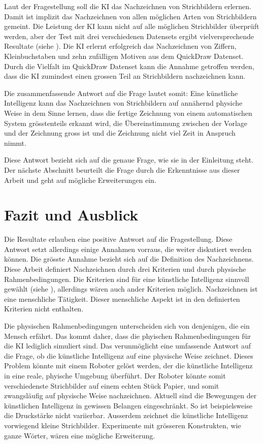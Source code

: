 Laut der Fragestellung soll die KI das Nachzeichnen von Strichbildern erlernen.
Damit ist implizit das Nachzeichnen von allen möglichen Arten von Strichbildern
gemeint. Die Leistung der KI kann nicht auf alle möglichen Strichbilder
überprüft werden, aber der Test mit drei verschiedenen Datensets ergibt
vielversprechende Resultate (siehe ). Die KI erlernt
erfolgreich das Nachzeichnen von Ziffern, Kleinbuchstaben und zehn zufälligen
Motiven aus dem QuickDraw Datenset. Durch die Vielfalt im QuickDraw Datenset
kann die Annahme getroffen werden, dass die KI zumindest einen grossen Teil an
Strichbildern nachzeichnen kann. 

Die zusammenfassende Antwort auf die Frage lautet somit: Eine künstliche
Intelligenz kann das Nachzeichnen von Strichbildern auf annähernd physiche Weise
in dem Sinne lernen, dass die fertige Zeichnung von einem automatischen System
grösstenteils erkannt wird, die Übereinstimmung zwischen der Vorlage und der
Zeichnung gross ist und die Zeichnung nicht viel Zeit in Anspruch nimmt.

Diese Antwort bezieht sich auf die genaue Frage, wie sie in der Einleitung steht.
Der nächste Abschnitt beurteilt die Frage durch die Erkenntnisse aus dieser
Arbeit und geht auf mögliche Erweiterungen ein.


\section{Fazit und Ausblick}\label{chap:d_faz-aus}
Die Resultate erlauben eine positive Antwort auf die Fragestellung. Diese
Antwort setzt allerdings einige Annahmen vorraus, die weiter diskutiert werden
können. Die grösste Annahme bezieht sich auf die Definition des Nachzeichnens.
Diese Arbeit definiert Nachzeichnen durch drei Kriterien und durch physische
Rahmenbedingungen. Die Kriterien sind für eine künstliche Intelligenz sinnvoll
gewählt (siehe ), allerdings wären auch ander
Kriterien möglich. Nachzeichnen ist eine menschliche Tätigkeit. Dieser
menschliche Aspekt ist in den definierten Kriterien nicht enthalten.

Die physischen Rahmenbedingungen unterscheiden sich von denjenigen, die ein
Mensch erfährt. Das kommt daher, dass die phyischen Rahmenbedingungen für die KI
lediglich simuliert sind. Das verunmöglicht eine umfassende Antwort auf die
Frage, ob die künstliche Intelligenz auf eine physische Weise zeichnet. Dieses
Problem könnte mit einem Roboter gelöst werden, der die künstliche Intelligenz
in eine reale, phyische Umgebung überführt. Der Roboter könnte somit
verschiedenste Strichbilder auf einem echten Stück Papier, und somit
zwangsläufig auf physische Weise nachzeichnen. Aktuell sind die Bewegungen der
künstlichen Intelligenz in gewissen Belangen eingeschränkt. So ist
beispielsweise die Druckstärke nicht variierbar. Ausserdem zeichnet die
künstliche Intelligenz vorwiegend kleine Strichbilder. Experimente mit grösseren
Konstrukten, wie ganze Wörter, wären eine mögliche Erweiterung. 

